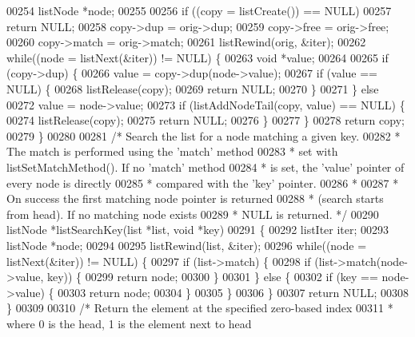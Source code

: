 \begin{DoxyCode}
00254     listNode *node;
00255 
00256     \textcolor{keywordflow}{if} ((copy = listCreate()) == NULL)
00257         \textcolor{keywordflow}{return} NULL;
00258     copy->dup = orig->dup;
00259     copy->free = orig->free;
00260     copy->match = orig->match;
00261     listRewind(orig, &iter);
00262     \textcolor{keywordflow}{while}((node = listNext(&iter)) != NULL) \{
00263         \textcolor{keywordtype}{void} *value;
00264 
00265         \textcolor{keywordflow}{if} (copy->dup) \{
00266             value = copy->dup(node->value);
00267             \textcolor{keywordflow}{if} (value == NULL) \{
00268                 listRelease(copy);
00269                 \textcolor{keywordflow}{return} NULL;
00270             \}
00271         \} \textcolor{keywordflow}{else}
00272             value = node->value;
00273         \textcolor{keywordflow}{if} (listAddNodeTail(copy, value) == NULL) \{
00274             listRelease(copy);
00275             \textcolor{keywordflow}{return} NULL;
00276         \}
00277     \}
00278     \textcolor{keywordflow}{return} copy;
00279 \}
00280 
00281 \textcolor{comment}{/* Search the list for a node matching a given key.}
00282 \textcolor{comment}{ * The match is performed using the 'match' method}
00283 \textcolor{comment}{ * set with listSetMatchMethod(). If no 'match' method}
00284 \textcolor{comment}{ * is set, the 'value' pointer of every node is directly}
00285 \textcolor{comment}{ * compared with the 'key' pointer.}
00286 \textcolor{comment}{ *}
00287 \textcolor{comment}{ * On success the first matching node pointer is returned}
00288 \textcolor{comment}{ * (search starts from head). If no matching node exists}
00289 \textcolor{comment}{ * NULL is returned. */}
00290 listNode *listSearchKey(list *list, \textcolor{keywordtype}{void} *key)
00291 \{
00292     listIter iter;
00293     listNode *node;
00294 
00295     listRewind(list, &iter);
00296     \textcolor{keywordflow}{while}((node = listNext(&iter)) != NULL) \{
00297         \textcolor{keywordflow}{if} (list->match) \{
00298             \textcolor{keywordflow}{if} (list->match(node->value, key)) \{
00299                 \textcolor{keywordflow}{return} node;
00300             \}
00301         \} \textcolor{keywordflow}{else} \{
00302             \textcolor{keywordflow}{if} (key == node->value) \{
00303                 \textcolor{keywordflow}{return} node;
00304             \}
00305         \}
00306     \}
00307     \textcolor{keywordflow}{return} NULL;
00308 \}
00309 
00310 \textcolor{comment}{/* Return the element at the specified zero-based index}
00311 \textcolor{comment}{ * where 0 is the head, 1 is the element next to head}

\end{DoxyCode}
